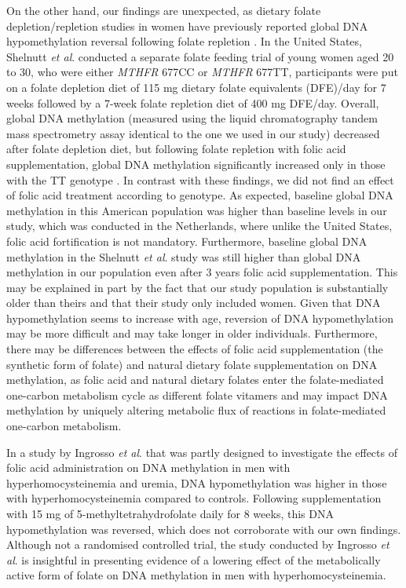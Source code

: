 \noindent On the other hand, our findings are unexpected, as dietary folate depletion/repletion studies in women have previously reported global DNA hypomethylation reversal following folate repletion \cite{c48,c49,c410}. In the United States, Shelnutt \emph{et al}. conducted a separate folate feeding trial of young women aged 20 to 30, who were either \emph{MTHFR} 677CC or \emph{MTHFR} 677TT, participants were put on a folate depletion diet of 115 mg dietary folate equivalents (DFE)/day for 7 weeks followed by a 7-week folate repletion diet of 400 mg DFE/day. Overall, global DNA methylation (measured using the liquid chromatography tandem mass spectrometry assay identical to the one we used in our study) decreased after folate depletion diet, but following folate repletion with folic acid supplementation, global DNA methylation significantly increased only in those with the TT genotype \cite{c442,c443}. In contrast with these findings, we did not find an effect of folic acid treatment according to genotype. As expected, baseline global DNA methylation in this American population was higher than baseline levels in our study, which was conducted in the Netherlands, where unlike the United States, folic acid fortification is not mandatory. Furthermore, baseline global DNA methylation in the Shelnutt \emph{et al}. study was still higher than global DNA methylation in our population even after 3 years folic acid supplementation. This may be explained in part by the fact that our study population is substantially older than theirs and that their study only included women. Given that DNA hypomethylation seems to increase with age, reversion of DNA hypomethylation may be more difficult and may take longer in older individuals. Furthermore, there may be differences between the effects of folic acid supplementation (the synthetic form of folate) and natural dietary folate supplementation on DNA methylation, as folic acid and natural dietary folates enter the folate-mediated one-carbon metabolism cycle as different folate vitamers and may impact DNA methylation by uniquely altering metabolic flux of reactions in folate-mediated one-carbon metabolism.

\noindent In a study by Ingrosso \emph{et al}. \cite{c443} that was partly designed to investigate the effects of folic acid administration on DNA methylation in men with hyperhomocysteinemia and uremia, DNA hypomethylation was higher in those with hyperhomocysteinemia compared to controls. Following supplementation with 15 mg of 5-methyltetrahydrofolate daily for 8 weeks, this DNA hypomethylation was reversed, which does not corroborate with our own findings. Although not a randomised controlled trial, the study conducted by Ingrosso \emph{et al}. is insightful in presenting evidence of a lowering effect of the metabolically active form of folate on DNA methylation in men with hyperhomocysteinemia.

